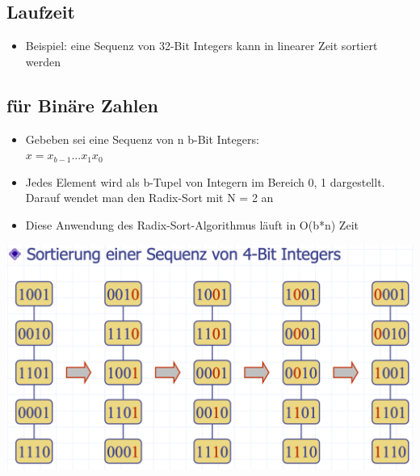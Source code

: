 \subsection{Laufzeit}
\begin{itemize}
    \item Beispiel: eine Sequenz von 32-Bit Integers kann in linearer Zeit sortiert werden
\end{itemize}

\subsection{für Binäre Zahlen}
\begin{itemize}
    \item Gebeben sei eine Sequenz von n b-Bit Integers:\\
    $x = x_{b - 1} ... x_1x_0$
    \item Jedes Element wird als b-Tupel von Integern im Bereich {0, 1} dargestellt. Darauf wendet man den Radix-Sort mit N = 2 an
    \item Diese Anwendung des Radix-Sort-Algorithmus läuft in O(b*n) Zeit
\end{itemize}


\vspace{-8pt}
\begin{center}
    \includegraphics[scale=.2]{graphic/07 RadixSort/radix.png}
\end{center}
\vspace{-8pt}




\newpage